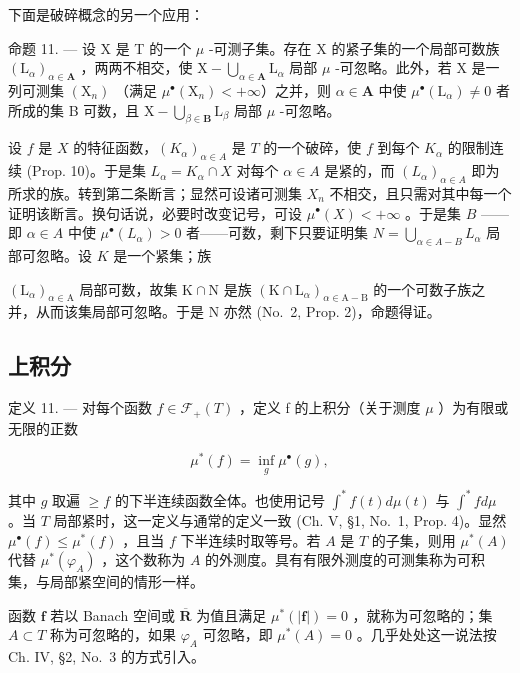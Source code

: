下面是破碎概念的另一个应用：

命题 11. --- 设 X 是 T 的一个 \(\mu\) -可测子集。存在 X 的紧子集的一个局部可数族 \((\mathrm{L}_{\alpha})_{\alpha \in \mathbf{A}}\) ，两两不相交，使 \(\mathrm{X} - \bigcup_{\alpha \in \mathbf{A}} \mathrm{L}_{\alpha}\) 局部 \(\mu\) -可忽略。此外，若 X 是一列可测集 \((\mathrm{X}_n)\) （满足 \(\mu^{\bullet}(\mathrm{X}_n) < +\infty\)）之并，则 \(\alpha \in \mathbf{A}\) 中使 \(\mu^{\bullet}(\mathrm{L}_{\alpha}) \neq 0\) 者所成的集 B 可数，且 \(\mathrm{X} - \bigcup_{\beta \in \mathbf{B}} \mathrm{L}_{\beta}\) 局部 \(\mu\) -可忽略。

设 \(f\) 是 \(X\) 的特征函数，\((K_{\alpha})_{\alpha \in A}\) 是 \(T\) 的一个破碎，使 \(f\) 到每个 \(K_{\alpha}\) 的限制连续 (Prop. 10)。于是集 \(L_{\alpha} = K_{\alpha} \cap X\) 对每个 \(\alpha \in A\) 是紧的，而 \((L_{\alpha})_{\alpha \in A}\) 即为所求的族。转到第二条断言；显然可设诸可测集 \(X_{n}\) 不相交，且只需对其中每一个证明该断言。换句话说，必要时改变记号，可设 \(\mu^{\bullet}(X) < +\infty\) 。于是集 \(B\) ——即 \(\alpha \in A\) 中使 \(\mu^{\bullet}(L_{\alpha}) > 0\) 者——可数，剩下只要证明集 \(N = \bigcup_{\alpha \in A - B} L_{\alpha}\) 局部可忽略。设 \(K\) 是一个紧集；族

\((\mathrm{L}_{\alpha})_{\alpha\in\mathrm{A}}\) 局部可数，故集 \(\mathrm{K}\cap\mathrm{N}\) 是族 \((\mathrm{K}\cap\mathrm{L}_{\alpha})_{\alpha\in\mathrm{A}-\mathrm{B}}\) 的一个可数子族之并，从而该集局部可忽略。于是 \(\mathrm{N}\) 亦然 (No.~2, Prop. 2)，命题得证。

\subsection{上积分}

定义 11. --- 对每个函数 \(f \in \mathcal{F}_{+}(T)\) ，定义 f 的上积分（关于测度 \(\mu\) ）为有限或无限的正数

\[
\mu^ {*} (f) = \inf _ {g} \mu^ {\bullet} (g),\tag{9}
\]

其中 \(g\) 取遍 \(\geqslant f\) 的下半连续函数全体。也使用记号 \(\int^{*} f(t) d\mu(t)\) 与 \(\int^{*} f d\mu\) 。当 \(T\) 局部紧时，这一定义与通常的定义一致 (Ch. V, §1, No.~1, Prop. 4)。显然 \(\mu^{\bullet}(f) \leqslant \mu^{*}(f)\) ，且当 \(f\) 下半连续时取等号。若 \(A\) 是 \(T\) 的子集，则用 \(\mu^{*}(A)\) 代替 \(\mu^{*}(\varphi_{A})\) ，这个数称为 \(A\) 的外测度。具有有限外测度的可测集称为可积集，与局部紧空间的情形一样。

函数 \(\mathbf{f}\) 若以 Banach 空间或 \(\overline{\mathbf{R}}\) 为值且满足 \(\mu^{*}(|\mathbf{f}|)=0\) ，就称为可忽略的；集 \(A\subset T\) 称为可忽略的，如果 \(\varphi_{A}\) 可忽略，即 \(\mu^{*}(A)=0\) 。几乎处处这一说法按 Ch. IV, §2, No.~3 的方式引入。


